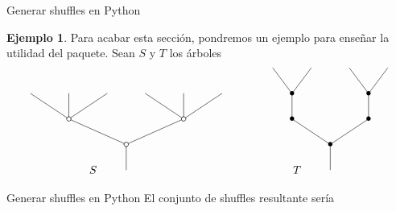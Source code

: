 \documentclass[12pt,aspectratio=169]{beamer}
\numberwithin{equation}{section}
\theoremstyle{definition}
\newtheorem{ex}[teo]{Ejemplo}
\begin{document}
{\begin{frame}{Generar shuffles en Python}
    \begin{ex}
        Para acabar esta secci\'on, pondremos un ejemplo para ense\~nar la utilidad del paquete. Sean $S$ y $T$ los \'arboles
        $$
            \xy
            <0.08cm, 0cm>:
            (0.0, 0.0)*{}="1"; %
            (0.0, 10.0)*\cir<2pt>{}="2"; %
            (-22.5, 20.0)*\cir<2pt>{}="3"; %
            (-37.5, 30.0)*{}="4"; %
            (-22.5, 30.0)*{}="5"; %
            (-7.5, 30.0)*{}="6"; %
            (22.5, 20.0)*\cir<2pt>{}="7"; %
            (7.5, 30.0)*{}="8"; %
            (22.5, 30.0)*{}="9"; %
            (37.5, 30.0)*{}="10"; %
            "1";"2" **\dir{-};
            "2";"3" **\dir{-};
            "3";"4" **\dir{-};
            "3";"5" **\dir{-};
            "3";"6" **\dir{-};
            "2";"7" **\dir{-};
            "7";"8" **\dir{-};
            "7";"9" **\dir{-};
            "7";"10" **\dir{-};
            (-13,0)*{S};
            \endxy
            \xy
            <0.08cm, 0cm>:
            (-10, 0.0)*{}="1";
            (10, 10.0)*{}="2";
            \endxy
            \xy
            <0.08cm, 0cm>:
            (0.0, 0.0)*{}="1"; %
            (0.0, 10.0)*=0{\bullet}="2"; %
            (-15.0, 20.0)*=0{\bullet}="3"; %
            (-15.0, 30.0)*=0{\bullet}="4"; %
            (-22.5, 40.0)*{}="5"; %
            (-7.5, 40.0)*{}="6"; %
            (15.0, 20.0)*=0{\bullet}="7"; %
            (15.0, 30.0)*=0{\bullet}="8"; %
            (7.5, 40.0)*{}="9"; %
            (22.5, 40.0)*{}="10"; %
            "1";"2" **\dir{-};
            "2";"3" **\dir{-};
            "3";"4" **\dir{-};
            "4";"5" **\dir{-};
            "4";"6" **\dir{-};
            "2";"7" **\dir{-};
            "7";"8" **\dir{-};
            "8";"9" **\dir{-};
            "8";"10" **\dir{-};
            (-13,0)*{T};
            \endxy
        $$
    \end{ex}
\end{frame}
\begin{frame}{Generar shuffles en Python}
    El conjunto de shuffles resultante ser\'ia
    \begin{center}\end{center}

\end{frame}
}
\end{document}
